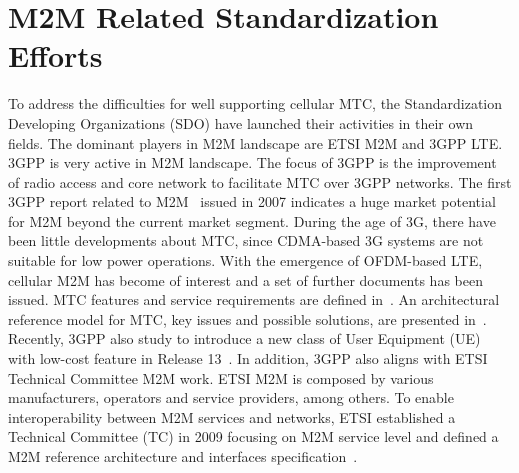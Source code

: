 \section{M2M Related Standardization Efforts}
To address the difficulties for well supporting cellular MTC, the Standardization Developing Organizations (SDO) have launched their activities in their own fields. The dominant players in M2M landscape are ETSI M2M and 3GPP LTE. 3GPP is very active in M2M landscape. The focus of 3GPP is the improvement of radio access and core network to facilitate MTC over 3GPP networks. The first 3GPP report related to M2M~\cite{3GPP/TR/facilitating} issued in 2007 indicates a huge market potential for M2M beyond the current market segment. During the age of 3G, there have been little developments about MTC, since CDMA-based 3G systems are not suitable for low power operations. With the emergence of OFDM-based LTE, cellular M2M has become of interest and a set of further documents has been issued. MTC features and service requirements are defined in~\cite{3GPP/service-requirement}. An architectural reference model for MTC, key issues and possible solutions, are presented in~\cite{3GPP/TR/23888V11}.
Recently, 3GPP also study to introduce a new class of User Equipment (UE) with low-cost feature in Release 13~\cite{3GPP/low-cost-device}.
In addition, 3GPP also aligns with ETSI Technical Committee M2M work.
ETSI M2M is composed by various manufacturers, operators and service providers, among others. To enable interoperability between M2M services and networks, ETSI established a Technical Committee (TC) in 2009 focusing on M2M service level and defined a M2M reference architecture and interfaces specification~\cite{ETSI/TS/102/690}.

